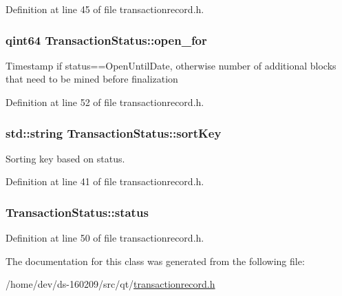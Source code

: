 Definition at line 45 of file transactionrecord.\+h.

\hypertarget{class_transaction_status_a861ed66c0fd49440bc1aacab5315a938}{}
\subsubsection[{open\+\_\+for}]{\setlength{\rightskip}{0pt plus 5cm}qint64 Transaction\+Status\+::open\+\_\+for}\label{class_transaction_status_a861ed66c0fd49440bc1aacab5315a938}
Timestamp if status==Open\+Until\+Date, otherwise number of additional blocks that need to be mined before finalization 

Definition at line 52 of file transactionrecord.\+h.

\hypertarget{class_transaction_status_afb31544f313d0630a41e376417233d68}{}
\subsubsection[{sort\+Key}]{\setlength{\rightskip}{0pt plus 5cm}std\+::string Transaction\+Status\+::sort\+Key}\label{class_transaction_status_afb31544f313d0630a41e376417233d68}


Sorting key based on status. 



Definition at line 41 of file transactionrecord.\+h.

\hypertarget{class_transaction_status_aa7d0dbec0880ccd8539d7e332f847451}{}
\subsubsection[{status}]{ Transaction\+Status\+::status}\label{class_transaction_status_aa7d0dbec0880ccd8539d7e332f847451}


Definition at line 50 of file transactionrecord.\+h.



The documentation for this class was generated from the following file\+:\begin{DoxyCompactItemize}
\item 
/home/dev/ds-\/160209/src/qt/\hyperlink{transactionrecord_8h}{transactionrecord.\+h}\end{DoxyCompactItemize}

